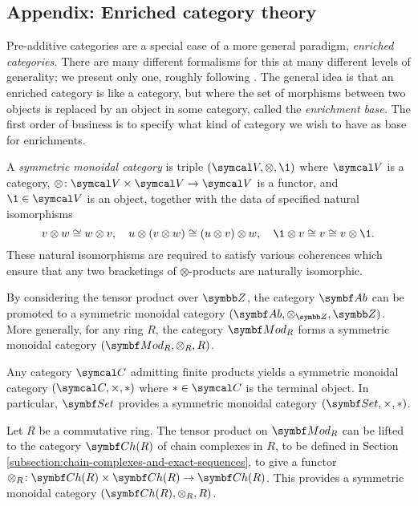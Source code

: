 \subsection{Appendix: Enriched category theory}
Pre-additive categories are a special case of a more general paradigm, \emph{enriched categories.} There are many different formalisms for this at many different levels
of generality; we present only one, roughly following \cite{riehl-categorical-homotopy-theory}. The general idea is that an enriched category is like a category, but where the set of morphisms between two objects is replaced by
an object in some category, called the \emph{enrichment base.} The first order of business is to specify what kind of category we wish to have as base for enrichments.
\begin{definition}
	A \emph{symmetric monoidal category} is triple \((\calV,\otimes,\1)\) where \(\calV\) is a category, \(\otimes\!:\calV\times\calV\to\calV\) is a functor,
	and \(\1\in\calV\) is an object, together with the data of specified natural isomorphisms
	\[ v\otimes w \cong w\otimes v,\quad u\otimes(v\otimes w)\cong (u\otimes v)\otimes w,\quad \1\otimes v\cong v \cong v\otimes \1. \]
	These natural isomorphisms are required to satisfy various coherences which ensure that any two bracketings of \(\otimes\)-products are naturally isomorphic.
\end{definition}
\begin{example}
	By considering the tensor product over \(\Z\), the category \(\Ab\) can be promoted to a symmetric monoidal category \((\Ab,\otimes_{\Z},\Z)\). More generally, for
	any ring \(R\), the category \(\Mod_R\) forms a symmetric monoidal category \((\Mod_R,\otimes_R,R)\).
\end{example}
\begin{example}
	Any category \(\calC\) admitting finite products yields a symmetric monoidal category \((\calC,\times,*)\) where \(*\in\calC\) is the terminal object. In particular,
	\(\Set\) provides a symmetric monoidal category \((\Set,\times,*)\).
\end{example}
\begin{example}
	Let \(R\) be a commutative ring. The tensor product on \(\Mod_R\) can be lifted to the category \(\Ch(R)\) of chain complexes in \(R\), to be defined in Section \ref{subsection:chain-complexes-and-exact-sequences},
	to give a functor \(\otimes_R\!:\Ch(R)\times\Ch(R)\to\Ch(R)\). This provides a symmetric monoidal category \((\Ch(R),\otimes_R,R)\).
\end{example}
